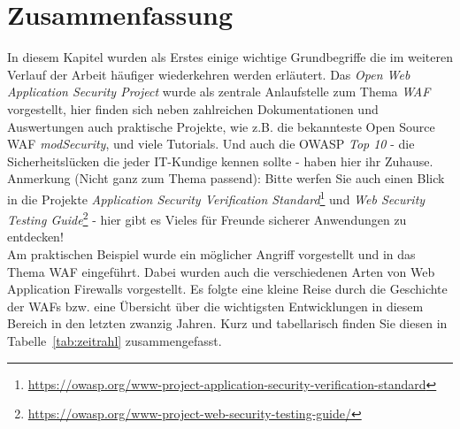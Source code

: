 \section{Zusammenfassung}

In diesem Kapitel wurden als Erstes einige wichtige Grundbegriffe die im weiteren Verlauf der Arbeit häufiger wiederkehren werden erläutert. Das \emph{Open Web Application Security Project} wurde als zentrale Anlaufstelle zum Thema \emph{WAF} vorgestellt, hier finden sich neben zahlreichen Dokumentationen und Auswertungen auch praktische Projekte, wie z.B. die bekannteste Open Source WAF \emph{modSecurity}, und viele Tutorials. Und auch die OWASP \emph{Top 10} - die Sicherheitslücken die jeder IT-Kundige kennen sollte - haben hier ihr Zuhause. \\

\textcolor{bhtGray}{ Anmerkung (Nicht ganz zum Thema passend):} Bitte werfen Sie auch einen Blick in die Projekte \emph{Application Security Verification Standard}\footnote{\url{https://owasp.org/www-project-application-security-verification-standard}} und \emph{Web Security Testing Guide}\footnote{\url{https://owasp.org/www-project-web-security-testing-guide/}} - hier gibt es Vieles für Freunde sicherer Anwendungen zu entdecken! \\

Am praktischen Beispiel wurde ein möglicher Angriff vorgestellt und in das Thema WAF eingeführt. Dabei wurden auch die verschiedenen Arten von Web Application Firewalls vorgestellt. Es folgte eine kleine Reise durch die Geschichte der WAFs bzw. eine Übersicht über die wichtigsten Entwicklungen in diesem Bereich in den letzten zwanzig Jahren. Kurz und tabellarisch finden Sie diesen in Tabelle~\ref{tab:zeitrahl} zusammengefasst.\\

